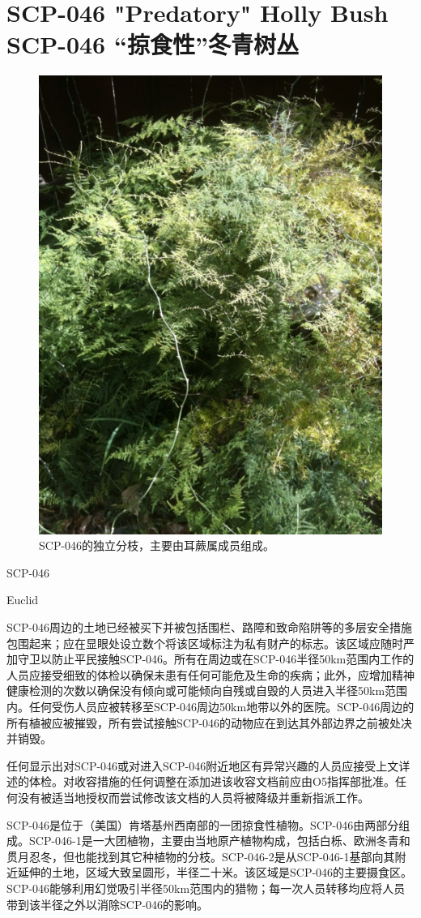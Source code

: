 \chapter[SCP-046 “掠食性”冬青树丛]{
    SCP-046 "Predatory" Holly Bush\\
    SCP-046 “掠食性”冬青树丛
}

\label{chap:SCP-046}

\begin{figure}[H]
    \centering
    \includegraphics[width=0.5\linewidth]{images/SCP-046.jpg}
    \caption*{SCP-046的独立分枝，主要由耳蕨属成员组成。}
\end{figure}

SCP-046

Euclid

SCP-046周边的土地已经被买下并被包括围栏、路障和致命陷阱等的多层安全措施包围起来；应在显眼处设立数个将该区域标注为私有财产的标志。该区域应随时严加守卫以防止平民接触SCP-046。所有在周边或在SCP-046半径50km范围内工作的人员应接受细致的体检以确保未患有任何可能危及生命的疾病；此外，应增加精神健康检测的次数以确保没有倾向或可能倾向自残或自毁的人员进入半径50km范围内。任何受伤人员应被转移至SCP-046周边50km地带以外的医院。SCP-046周边的所有植被应被摧毁，所有尝试接触SCP-046的动物应在到达其外部边界之前被处决并销毁。

任何显示出对SCP-046或对进入SCP-046附近地区有异常兴趣的人员应接受上文详述的体检。对收容措施的任何调整在添加进该收容文档前应由O5指挥部批准。任何没有被适当地授权而尝试修改该文档的人员将被降级并重新指派工作。

SCP-046是位于（美国）肯塔基州西南部的一团掠食性植物。SCP-046由两部分组成。SCP-046-1是一大团植物，主要由当地原产植物构成，包括白栎、欧洲冬青和贯月忍冬，但也能找到其它种植物的分枝。SCP-046-2是从SCP-046-1基部向其附近延伸的土地，区域大致呈圆形，半径二十米。该区域是SCP-046的主要摄食区。SCP-046能够利用幻觉吸引半径50km范围内的猎物；每一次人员转移均应将人员带到该半径之外以消除SCP-046的影响。

